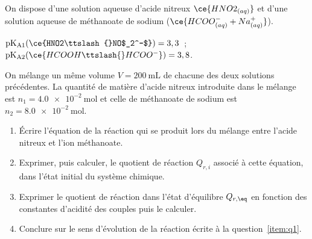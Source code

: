 On dispose d'une solution aqueuse d'acide nitreux $\ce{HNO2_{(aq)}}$
et d'une solution aqueuse de méthanoate de sodium
($\ce{HCOO^{-}_{(aq)} + Na^{+}_{(aq)}}$).

\begin{donnees}
    $\mathrm{pK_{A1}}(\ce{HNO2\ttslash{}NO$_2^-$})=3,3$~; \
    $\mathrm{pK_{A2}}(\ce{HCOOH\ttslash{}HCOO^-})=3,8$.
\end{donnees}

On mélange un même volume $V=\qty{200}{\mL}$ de chacune des deux solutions
précédentes. La quantité de matière d'acide nitreux introduite dans le mélange
est $n_{1}=\qty{4.0e-2}{\mol}$ et celle de méthanoate de sodium
est $n_{2}=\qty{8.0e-2}{\mol}$.

\begin{enumerate}
    \item \label{item:q1}
          Écrire l'équation de la réaction qui se produit lors du mélange entre
          l'acide nitreux et l'ion méthanoate.
    \item Exprimer, puis calculer, le quotient de réaction $Q_{r,i}$ associé à
          cette équation, dans l'état initial du système chimique.
    \item \label{item:q3}
          Exprimer le quotient de réaction dans l'état d'équilibre $Q_{r,\eq}$
          en fonction des constantes d'acidité des couples puis le calculer.
    \item Conclure sur le sens d'évolution de la réaction écrite à la
          question~\ref{item:q1}.
\end{enumerate}

